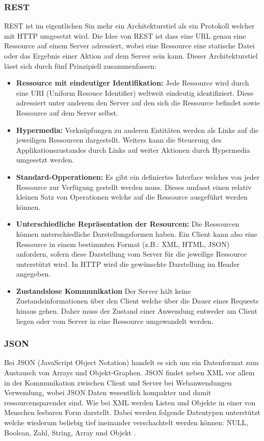 \subsubsection{REST}
\label{sec:HTTP}
REST ist im eigentlichen Sin mehr ein Architekturstiel als ein Protokoll welcher mit HTTP umgesetzt wird.
Die Idee von REST ist dass eine URL genau eine Ressource auf einem Server adressiert, 
wobei eine Ressource eine statische Datei oder das Ergebnis einer Aktion auf dem Server sein kann.
Dieser Architekturstiel lässt sich durch fünf Prinzipiell zusammenfassen:
\begin{itemize}
	\item \textbf{Ressource mit eindeutiger Identifikation:}
		Jede Ressource wird durch eine URI (Uniform Resouce Identifier) weltweit eindeutig identifiziert.
		Diese adressiert unter anderem den Server auf den sich die Ressource befindet sowie Ressource auf dem Server selbst.
	\item \textbf{Hypermedia:}
		Verknüpfungen zu anderen Entitäten werden als Links auf die jeweiligen Ressourcen dargestellt.
		Weiters kann die Steuerung des Applikationszustandes durch Links auf weiter Aktionen durch Hypermedia umgesetzt werden.
	\item \textbf{Standard-Opperationen:}
		Es gibt ein definiertes Interface welches von jeder Ressource zur Verfügung gestellt werden muss.
		Dieses umfasst einen relativ kleinen Satz von Operationen welche auf die Ressource ausgeführt werden können.
	\item \textbf{Unterschiedliche Repräsentation der Resourcen:}
		Die Ressourcen können unterschiedliche Darstellungsformen haben.
		Ein Client kann also eine Ressource in einem bestimmten Format (z.B.: XML, HTML, JSON) anfordern,
		sofern diese Darstellung vom Server für die jeweilige Ressource unterstützt wird.
		In HTTP wird die gewünschte Darstellung im Header angegeben.
	\item \textbf{Zustandslose Kommunikation}
		Der Server hält keine Zustandsinformationen über den Client welche über die Dauer eines Requests hinaus gehen.
		Daher muss der Zustand einer Anwendung entweder am Client liegen oder vom Server in eine Ressource umgewandelt werden.
\end{itemize}
\cite{rest}

\subsubsection{JSON}
\label{sec:JSON}
Bei JSON (JavaScript Object Notation) handelt es sich um ein Datenformat zum Austausch von Arrays und Objekt-Graphen.
JSON findet neben XML vor allem in der Kommunikation zwischen Client und Server bei Webanwendungen Verwendung, 
wobei JSON Daten wesentlich kompakter und damit ressourcensparender sind.
Wie bei XML werden Listen und Objekte in einer von Menschen lesbaren Form darstellt.
Dabei werden folgende Datentypen unterstützt welche wiederum beliebig tief ineinander verschachtelt werden können: NULL, Boolean, Zahl, String, Array und Objekt \cite{ajax}.

